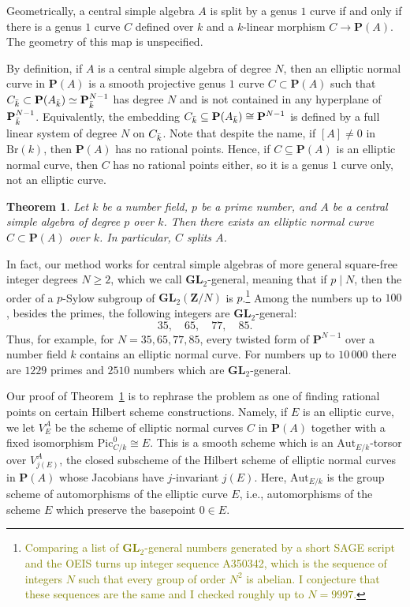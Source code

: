 \documentclass[10pt,letterpaper,twoside]{article}
\newcommand{\BA}[1]{\textcolor{olive}{#1}}
\renewcommand{\1}{\mathbf{1}}
\newcommand{\bP}{\mathbf{P}}
\newcommand{\bZ}{\mathbf{Z}}
\newcommand{\Aut}{\mathrm{Aut}}
\renewcommand{\geq}{\geqslant}
\newcommand{\GL}{\mathbf{GL}}
\newcommand{\Pic}{\mathrm{Pic}}
\newcommand{\Br}{\mathrm{Br}}
\newcommand{\iso}{\cong}
\theoremstyle{plain}
\newtheorem{theorem}{Theorem}[section]
\theoremstyle{plain}
\theoremstyle{definition}
\theoremstyle{named}
\theoremstyle{definition}
\begin{document}
Geometrically, a central simple algebra $A$ is split by a genus $1$ curve if and only if there is a genus $1$ curve $C$
defined over $k$ and a $k$-linear morphism $C\rightarrow\bP(A)$. The geometry of this map is
unspecified.

By definition, if $A$ is a central simple algebra of degree $N$, then an elliptic normal curve in $\bP(A)$ is a
smooth projective genus $1$ curve $C\subset \bP(A)$ such that $C_{\Bar{k}}\subset
\bP(A_{\Bar{k}})\simeq \bP_{\Bar{k}}^{N-1}$ has degree $N$ and is not contained in any hyperplane of
$\bP_{\Bar{k}}^{N-1}$.
Equivalently, the embedding
$C_{\Bar{k}}\subseteq\bP(A_{\Bar{k}})\iso\bP^{N-1}$ is defined by a full linear system of degree $N$
on $C_{\Bar{k}}$. Note that despite the name, if $[A]\neq 0$ in $\Br(k)$, then $\bP(A)$ has no
rational points. Hence, if $C\subseteq\bP(A)$ is an elliptic normal curve, then $C$ has no rational points either, so it is a
genus $1$ curve only, not an elliptic curve.

\begin{theorem}\label{mainthm}
    Let $k$ be a number field, $p$ be a prime number, and $A$ be a central simple algebra of degree
    $p$ over $k$. Then there exists an elliptic normal curve $C\subset \bP(A)$ over $k$. In
    particular, $C$ splits $A$.
\end{theorem}

In fact, our method works for central simple algebras of more general square-free integer degrees
$N\geq 2$, which we
call $\GL_2$-general, meaning that if $p\;|\;N$, then the order of a $p$-Sylow subgroup of
$\GL_2(\bZ/N)$ is $p$.\footnote{\BA{Comparing a list of $\GL_2$-general numbers generated by a short
{\ttfamily SAGE} script and the {\ttfamily OEIS} turns up integer sequence {\ttfamily A350342},
which is the sequence of integers $N$ such that every group of order $N^2$ is abelian. I conjecture
that these sequences are the same and I checked roughly up to $N=9997$.}} Among the numbers up to $100$, besides the primes, the following integers are
$\GL_2$-general:
$$35,\quad 65,\quad 77,\quad 85.$$
Thus, for example, for $N=35,65,77,85$, every twisted form of $\bP^{N-1}$ over a number field $k$ contains an
elliptic normal curve. For numbers up to $10\,000$ there are $1229$ primes and $2510$ numbers which
are $\GL_2$-general.

Our proof of Theorem~\ref{mainthm} is to rephrase the problem as one of finding rational points on
certain Hilbert scheme constructions. Namely, if $E$ is an elliptic curve, we let $V_E^A$ be the scheme of elliptic normal curves
$C$ in $\bP(A)$ together with a fixed isomorphism $\Pic_{C/k}^0\iso E$.
This is a smooth scheme which is an $\Aut_{E/k}$-torsor over $V_{j(E)}^A$, the closed subscheme of the
Hilbert scheme of elliptic normal curves in $\bP(A)$ whose Jacobians have $j$-invariant $j(E)$.
Here, $\Aut_{E/k}$ is the group scheme of automorphisms of the elliptic curve $E$, i.e.,
automorphisms of the scheme $E$ which preserve the basepoint $0\in E$.
\end{document}
